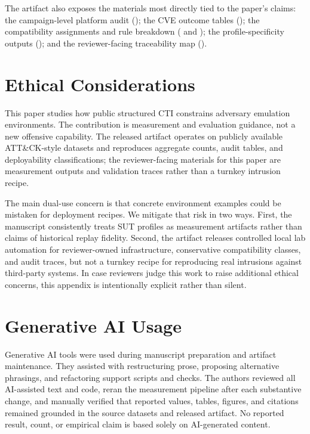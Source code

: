 \documentclass[sigconf]{acmart}
\begin{document}
The artifact also exposes the materials most directly tied to the paper's claims: the campaign-level platform audit (); the CVE outcome tables (); the compatibility assignments and rule breakdown ( and ); the profile-specificity outputs (); and the reviewer-facing traceability map ().

\section{Ethical Considerations}

This paper studies how public structured CTI constrains adversary emulation environments. The contribution is measurement and evaluation guidance, not a new offensive capability. The released artifact operates on publicly available ATT\&CK-style datasets and reproduces aggregate counts, audit tables, and deployability classifications; the reviewer-facing materials for this paper are measurement outputs and validation traces rather than a turnkey intrusion recipe.

The main dual-use concern is that concrete environment examples could be mistaken for deployment recipes. We mitigate that risk in two ways. First, the manuscript consistently treats SUT profiles as measurement artifacts rather than claims of historical replay fidelity. Second, the artifact releases controlled local lab automation for reviewer-owned infrastructure, conservative compatibility classes, and audit traces, but not a turnkey recipe for reproducing real intrusions against third-party systems. In case reviewers judge this work to raise additional ethical concerns, this appendix is intentionally explicit rather than silent.

\section{Generative AI Usage}

Generative AI tools were used during manuscript preparation and artifact maintenance. They assisted with restructuring prose, proposing alternative phrasings, and refactoring support scripts and checks. The authors reviewed all AI-assisted text and code, reran the measurement pipeline after each substantive change, and manually verified that reported values, tables, figures, and citations remained grounded in the source datasets and released artifact. No reported result, count, or empirical claim is based solely on AI-generated content.
\end{document}
